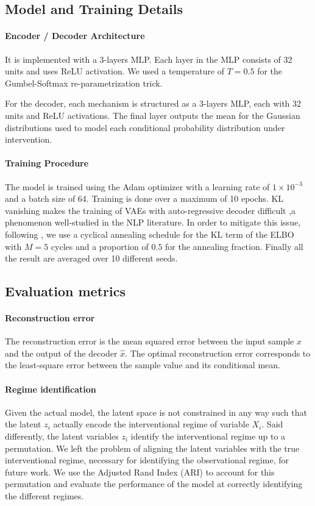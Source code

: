 \documentclass{article}
\begin{document}
\subsection{Model and Training Details}\label{subsec:modeltrainingdetails}

\paragraph{Encoder / Decoder Architecture} It is implemented with a 3-layers MLP. Each layer in the MLP consists of 32
units and uses ReLU activation. We used a temperature of $T=0.5$ for the
Gumbel-Softmax re-parametrization trick.

For the decoder, each mechanism is structured as a 3-layers MLP, each with 32
units and ReLU activations. The final layer outputs the mean for the Gaussian
distributions used to model each conditional probability distribution under
intervention.

\paragraph{Training Procedure}
The model is trained using the Adam optimizer with a learning rate of \(1
\times 10^{-3}\) and a batch size of 64. Training is done over a maximum of 10
epochs. KL vanishing makes the training of VAEs with auto-regressive decoder
difficult ,a phenomenon well-studied in the NLP literature. In order to
mitigate this issue, following \citet{fu2019cyclicalannealingschedulesimple},
we use a cyclical annealing schedule for the KL term of the ELBO with $M=5$
cycles and a proportion of $0.5$ for the annealing fraction. Finally all the
result are averaged over 10 different seeds.

\subsection{Evaluation metrics}

\paragraph{Reconstruction error} The reconstruction error is the mean squared error between the input sample $x$
and the output of the decoder $\hat{x}$. The optimal reconstruction error
corresponds to the least-square error between the sample value and its
conditional mean.

\paragraph{Regime identification} Given the actual model, the latent space is not constrained in any way such
that the latent $z_i$ actually encode the interventional regime of variable
$X_i$. Said differently, the latent variables $z_i$ identify the interventional
regime up to a permutation. We left the problem of aligning the latent
variables with the true interventional regime, necessary for identifying the
observational regime, for future work. We use the Adjusted Rand Index (ARI) to
account for this permutation and evaluate the performance of the model at
correctly identifying the different regimes.
\end{document}
